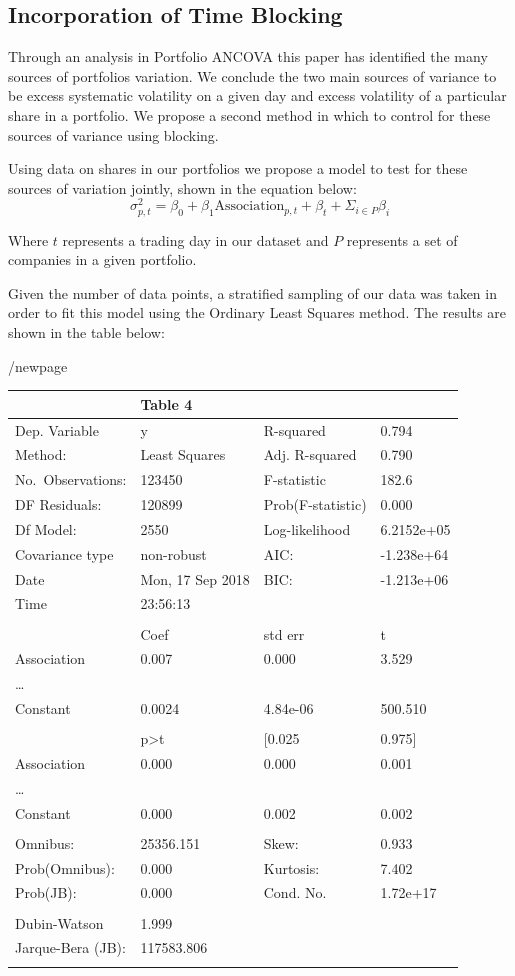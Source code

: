 \documentclass[11pt]{article}
\begin{document}
\newpage

\hypertarget{incorporation-of-time-blocking}{%
\subsection{Incorporation of Time
Blocking}\label{incorporation-of-time-blocking}}

Through an analysis in Portfolio ANCOVA this paper has identified the
many sources of portfolios variation. We conclude the two main sources
of variance to be excess systematic volatility on a given day and excess
volatility of a particular share in a portfolio. We propose a second
method in which to control for these sources of variance using blocking.

Using data on shares in our portfolios we propose a model to test for
these sources of variation jointly, shown in the equation below:\\
\[ \sigma_{p,t}^{2} = \beta_{0} + \beta_{1} \text{Association}_{p,t} + \beta_{t} + \Sigma_{i \in P} \beta_{i} \]

Where \(t\) represents a trading day in our dataset and \(P\) represents
a set of companies in a given portfolio.

Given the number of data points, a stratified sampling of our data was
taken in order to fit this model using the Ordinary Least Squares
method. The results are shown in the table below:

/newpage

\begin{longtable}[]{@{}llll@{}}
\toprule
& \textbf{Table 4} & &\tabularnewline
\midrule
\endhead
Dep. Variable & y & R-squared & 0.794\tabularnewline
Method: & Least Squares & Adj. R-squared & 0.790\tabularnewline
No.~Observations: & 123450 & F-statistic & 182.6\tabularnewline
DF Residuals: & 120899 & Prob(F-statistic) & 0.000\tabularnewline
Df Model: & 2550 & Log-likelihood & 6.2152e+05\tabularnewline
Covariance type & non-robust & AIC: & -1.238e+64\tabularnewline
Date & Mon, 17 Sep 2018 & BIC: & -1.213e+06\tabularnewline
Time & 23:56:13 & &\tabularnewline
& & &\tabularnewline
& Coef & std err & t\tabularnewline
Association & 0.007 & 0.000 & 3.529\tabularnewline
\ldots{} & & &\tabularnewline
Constant & 0.0024 & 4.84e-06 & 500.510\tabularnewline
& & &\tabularnewline
& p\textgreater{}\textbar{}t\textbar{} & {[}0.025 &
0.975{]}\tabularnewline
Association & 0.000 & 0.000 & 0.001\tabularnewline
\ldots{} & & &\tabularnewline
Constant & 0.000 & 0.002 & 0.002\tabularnewline
& & &\tabularnewline
Omnibus: & 25356.151 & Skew: & 0.933\tabularnewline
Prob(Omnibus): & 0.000 & Kurtosis: & 7.402\tabularnewline
Prob(JB): & 0.000 & Cond. No. & 1.72e+17\tabularnewline
& & &\tabularnewline
Dubin-Watson & 1.999 & &\tabularnewline
Jarque-Bera (JB): & 117583.806 & &\tabularnewline
& & &\tabularnewline
\bottomrule
\end{longtable}
\end{document}
